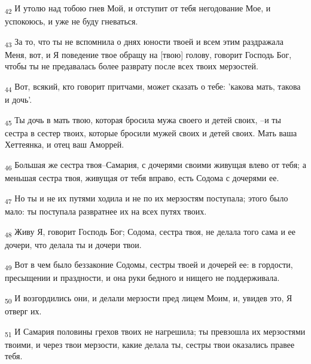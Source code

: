 \begin{tcolorbox}
\textsubscript{42} И утолю над тобою гнев Мой, и отступит от тебя негодование Мое, и успокоюсь, и уже не буду гневаться.
\end{tcolorbox}
\begin{tcolorbox}
\textsubscript{43} За то, что ты не вспомнила о днях юности твоей и всем этим раздражала Меня, вот, и Я поведение твое обращу на [твою] голову, говорит Господь Бог, чтобы ты не предавалась более разврату после всех твоих мерзостей.
\end{tcolorbox}
\begin{tcolorbox}
\textsubscript{44} Вот, всякий, кто говорит притчами, может сказать о тебе: 'какова мать, такова и дочь'.
\end{tcolorbox}
\begin{tcolorbox}
\textsubscript{45} Ты дочь в мать твою, которая бросила мужа своего и детей своих, --и ты сестра в сестер твоих, которые бросили мужей своих и детей своих. Мать ваша Хеттеянка, и отец ваш Аморрей.
\end{tcolorbox}
\begin{tcolorbox}
\textsubscript{46} Большая же сестра твоя--Самария, с дочерями своими живущая влево от тебя; а меньшая сестра твоя, живущая от тебя вправо, есть Содома с дочерями ее.
\end{tcolorbox}
\begin{tcolorbox}
\textsubscript{47} Но ты и не их путями ходила и не по их мерзостям поступала; этого было мало: ты поступала развратнее их на всех путях твоих.
\end{tcolorbox}
\begin{tcolorbox}
\textsubscript{48} Живу Я, говорит Господь Бог; Содома, сестра твоя, не делала того сама и ее дочери, что делала ты и дочери твои.
\end{tcolorbox}
\begin{tcolorbox}
\textsubscript{49} Вот в чем было беззаконие Содомы, сестры твоей и дочерей ее: в гордости, пресыщении и праздности, и она руки бедного и нищего не поддерживала.
\end{tcolorbox}
\begin{tcolorbox}
\textsubscript{50} И возгордились они, и делали мерзости пред лицем Моим, и, увидев это, Я отверг их.
\end{tcolorbox}
\begin{tcolorbox}
\textsubscript{51} И Самария половины грехов твоих не нагрешила; ты превзошла их мерзостями твоими, и через твои мерзости, какие делала ты, сестры твои оказались правее тебя.
\end{tcolorbox}
